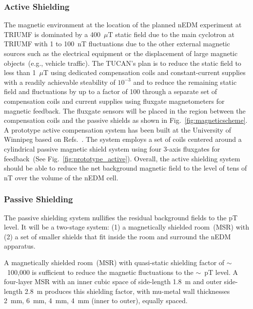 \subsubsection{Active Shielding}

The magnetic environment at the location of the planned nEDM
experiment at TRIUMF is dominated by a 400~$\mu$T static field due to
the main cyclotron at TRIUMF with 1 to 100~nT fluctuations due to the
other external magnetic sources such as the electrical equipment or
the displacement of large magnetic objects~(e.g., vehicle traffic).
The TUCAN's plan is to reduce the static field to less than 1~$\mu$T
using dedicated compensation coils and constant-current supplies with
a readily achievable steability of $10^{-3}$ and to reduce the
remaining static field and fluctuations by up to a factor of 100
through a separate set of compensation coils and current supplies
using fluxgate magnetometers for magnetic feedback. The fluxgate
sensors will be placed in the region between the compensation coils
and the passive shields as shown in Fig.~\ref{fig:magneticscheme}.  A
prototype active compensation system has been built at the University
of Winnipeg based on Refs.~\cite{beatrice,afach2014dynamic}. The
system employs a set of coils centered around a cylindrical passive
magnetic shield system using four 3-axis fluxgates for feedback~(See
Fig.~\ref{fig:prototype_active}). Overall, the active shielding
system should be able to reduce the net background magnetic field to
the level of tens of nT over the volume of the nEDM cell.


\subsubsection{Passive Shielding}
The passive shielding system nullifies the residual background fields
to the pT level. It will be a two-stage system: (1) a
magnetically shielded room~(MSR) with (2) a set of smaller shields
that fit inside the room and surround the nEDM apparatus.

A magnetically shielded room~(MSR) with quasi-static
shielding factor of $\sim$~100,000 is sufficient to reduce the magnetic
fluctuations to the $\sim$~pT level. A four-layer MSR with an inner
cubic space of side-length 1.8~m and outer side-length 2.8~m produces
this shielding factor, with mu-metal wall thicknesses 2~mm, 6~mm,
4~mm, 4~mm (inner to outer), equally spaced.


